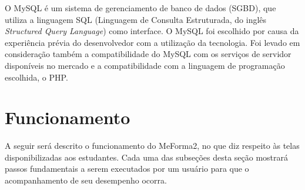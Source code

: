 O  MySQL é um sistema de gerenciamento de banco de dados (SGBD), que utiliza a linguagem SQL (Linguagem de Consulta Estruturada, do inglês \textit{Structured Query Language}) como interface.
O MySQL foi escolhido por causa da experiência prévia do desenvolvedor com a utilização da tecnologia. Foi levado em consideração também a compatibilidade do MySQL com os serviços de servidor disponíveis no mercado e a compatibilidade com a linguagem de programação escolhida, o PHP.

\section{Funcionamento}
A seguir será descrito o funcionamento do MeForma2, no que diz respeito às telas disponibilizadas aos estudantes. Cada uma das subseções desta seção mostrará passos fundamentais a serem executados por um usuário para que o acompanhamento de seu desempenho ocorra. 
